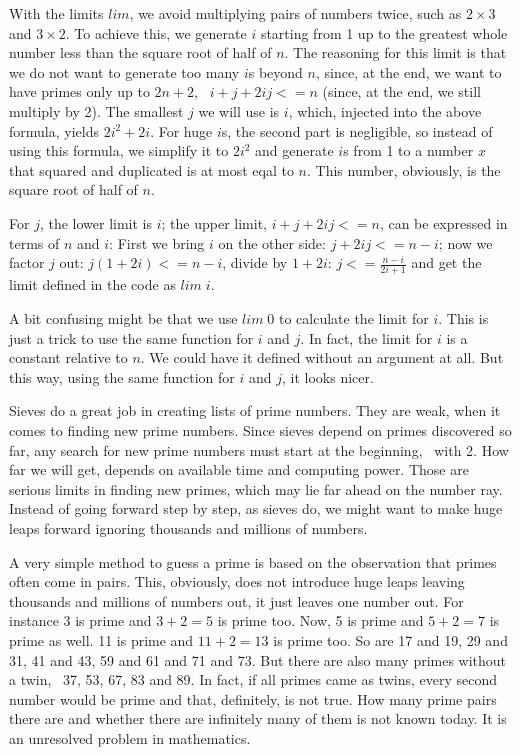 \documentclass{scrreprt}
\newcommand{\Varid}[1]{\mathit{#1}}
\begin{document}
With the limits \ensuremath{\Varid{lim}}, we avoid multiplying pairs
of numbers twice, such as $2 \times 3$ and $3 \times 2$.
To achieve this, we generate \ensuremath{\Varid{i}} starting from 1
up to the greatest whole number less than the square root of 
half of \ensuremath{\Varid{n}}. The reasoning for this limit is that
we do not want to generate too many \ensuremath{\Varid{i}}s beyond \ensuremath{\Varid{n}},
since, at the end, we want to have primes only up to $2n+2$, \ie\
$i+j+2ij <= n$ (since, at the end, we still multiply by 2).
The smallest \ensuremath{\Varid{j}} we will use is \ensuremath{\Varid{i}}, which, injected into the above
formula, yields $2i^2 + 2i$. 
For huge \ensuremath{\Varid{i}}s, the second part is negligible,
so instead of using this formula, we simplify it to $2i^2$
and generate \ensuremath{\Varid{i}}s from 1 to a number $x$
that squared and duplicated is at most eqal to $n$.
This number, obviously, is the square root of half of $n$.

For $j$, the lower limit is $i$;
the upper limit, $i+j+2ij <= n$,
can be expressed in terms of $n$ and $i$:
First we bring $i$ on the other side: $j + 2ij <= n-i$;
now we factor $j$ out: $j(1 + 2i) <= n-i$, 
divide by $1 + 2i$: $j <= \frac{n-i}{2i+1}$
and get the limit defined in the code as \ensuremath{\Varid{lim}\;\Varid{i}}.

A bit confusing might be that we use \ensuremath{\Varid{lim}\;\mathrm{0}} 
to calculate the limit for \ensuremath{\Varid{i}}.
This is just a trick to use the same function for \ensuremath{\Varid{i}} and \ensuremath{\Varid{j}}.
In fact, the limit for \ensuremath{\Varid{i}} is a constant relative to \ensuremath{\Varid{n}}.
We could have it defined without an argument at all.
But this way, using the same function for \ensuremath{\Varid{i}} and \ensuremath{\Varid{j}},
it looks nicer.

Sieves do a great job in creating lists of prime numbers.
They are weak, when it comes to finding new prime numbers.
Since sieves depend on primes discovered so far,
any search for new prime numbers must start at the beginning,
\ie\ with 2.
How far we will get, depends on available time and
computing power. Those are serious limits in finding new primes,
which may lie far ahead on the number ray. 
Instead of going forward step by step, as sieves do,
we might want to make huge leaps forward ignoring
thousands and millions of numbers.

A very simple method to guess a prime is based on 
the observation that primes often come in pairs.
This, obviously, does not introduce huge leaps
leaving thousands and millions of numbers out,
it just leaves one number out.
For instance 3 is prime and $3 + 2 = 5$ is prime too.
Now, 5 is prime and $5 + 2 = 7$ is prime as well.
11 is prime and $11 + 2 = 13$ is prime too.
So are 17 and 19, 29 and 31, 41 and 43, 59 and 61 and 71 and 73.
But there are also many primes without a twin,
\eg\ 37, 53, 67, 83 and 89.
In fact, if all primes came as twins,
every second number would be prime and that, definitely,
is not true.
How many prime pairs there are and whether there are 
infinitely many of them is not known today.
It is an unresolved problem in mathematics.
\end{document}
